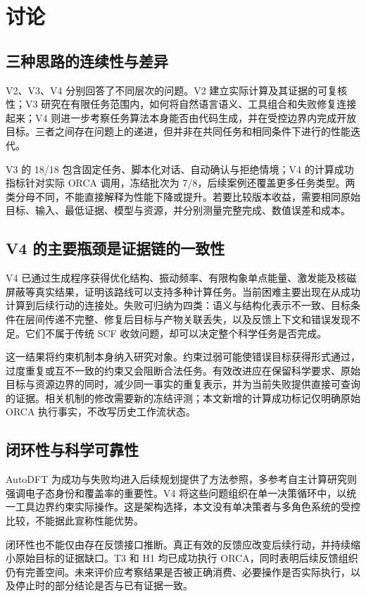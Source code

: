 \section{讨论}
\subsection{三种思路的连续性与差异}
V2、V3、V4 分别回答了不同层次的问题。V2 建立实际计算及其证据的可复核性；V3 研究在有限任务范围内，如何将自然语言语义、工具组合和失败修复连接起来；V4 则进一步考察任务算法本身能否由代码生成，并在受控边界内完成开放目标。三者之间存在问题上的递进，但并非在共同任务和相同条件下进行的性能迭代。

V3 的 18/18 包含固定任务、脚本化对话、自动确认与拒绝情境；V4 的计算成功指标针对实际 ORCA 调用，冻结批次为 7/8，后续案例还覆盖更多任务类型。两类分母不同，不能直接解释为性能下降或提升。若要比较版本收益，需要相同原始目标、输入、最低证据、模型与资源，并分别测量完整完成、数值误差和成本。

\subsection{V4 的主要瓶颈是证据链的一致性}
V4 已通过生成程序获得优化结构、振动频率、有限构象单点能量、激发能及核磁屏蔽等真实结果，证明该路线可以支持多种计算任务。当前困难主要出现在从成功计算到后续行动的连接处。失败可归纳为四类：语义与结构化表示不一致、目标条件在层间传递不完整、修复后目标与产物关联丢失，以及反馈上下文和错误发现不足。它们不属于传统 SCF 收敛问题，却可以决定整个科学任务是否完成。

这一结果将约束机制本身纳入研究对象。约束过弱可能使错误目标获得形式通过，过度重复或互不一致的约束又会阻断合法任务。有效改进应在保留科学要求、原始目标与资源边界的同时，减少同一事实的重复表示，并为当前失败提供直接可查询的证据。相关机制的修改需要新的冻结评测；本文新增的计算成功标记仅明确原始 ORCA 执行事实，不改写历史工作流状态。

\subsection{闭环性与科学可靠性}
AutoDFT 为成功与失败均进入后续规划提供了方法参照，多参考自主计算研究则强调电子态身份和覆盖率的重要性。V4 将这些问题组织在单一决策循环中，以统一工具边界约束实际操作。这是架构选择，本文没有单决策者与多角色系统的受控比较，不能据此宣称性能优势。

闭环性也不能仅由存在反馈接口推断。真正有效的反馈应改变后续行动，并持续缩小原始目标的证据缺口。T3 和 H1 均已成功执行 ORCA，同时表明后续反馈组织仍有完善空间。未来评价应考察结果是否被正确消费、必要操作是否实际执行，以及停止时的部分结论是否与已有证据一致。

